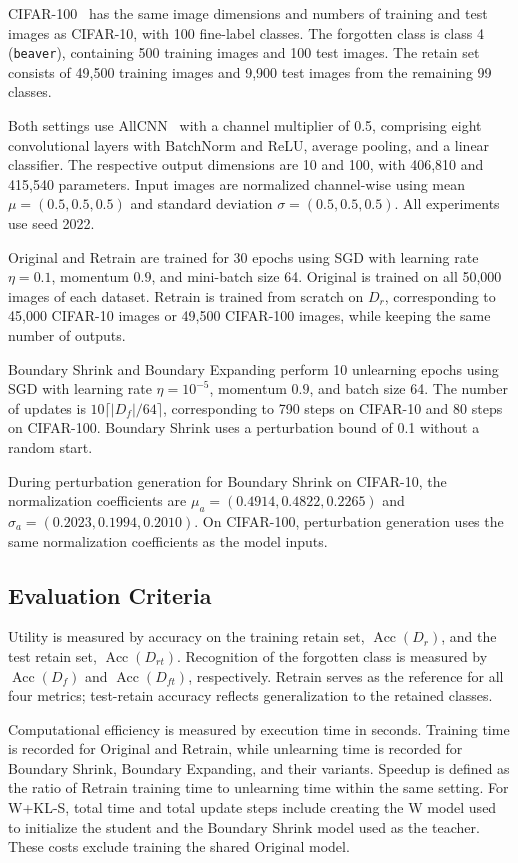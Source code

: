 \documentclass[conference]{IEEEtran}
\begin{document}
CIFAR-100~\cite{krizhevsky2009learning} has the same image dimensions and numbers of training and test images as CIFAR-10, with 100 fine-label classes. The forgotten class is class 4 (\texttt{beaver}), containing 500 training images and 100 test images. The retain set consists of 49,500 training images and 9,900 test images from the remaining 99 classes.

Both settings use AllCNN~\cite{springenberg2015allcnn} with a channel multiplier of 0.5, comprising eight convolutional layers with BatchNorm and ReLU, average pooling, and a linear classifier. The respective output dimensions are 10 and 100, with 406,810 and 415,540 parameters. Input images are normalized channel-wise using mean $\mu=(0.5,0.5,0.5)$ and standard deviation $\sigma=(0.5,0.5,0.5)$. All experiments use seed 2022.

Original and Retrain are trained for 30 epochs using SGD with learning rate $\eta=0.1$, momentum $0.9$, and mini-batch size 64. Original is trained on all 50,000 images of each dataset. Retrain is trained from scratch on $D_r$, corresponding to 45,000 CIFAR-10 images or 49,500 CIFAR-100 images, while keeping the same number of outputs.

Boundary Shrink and Boundary Expanding perform 10 unlearning epochs using SGD with learning rate $\eta=10^{-5}$, momentum $0.9$, and batch size 64. The number of updates is $10\lceil|D_f|/64\rceil$, corresponding to 790 steps on CIFAR-10 and 80 steps on CIFAR-100. Boundary Shrink uses a perturbation bound of 0.1 without a random start.

During perturbation generation for Boundary Shrink on CIFAR-10, the normalization coefficients are $\mu_a=(0.4914,0.4822,0.2265)$ and $\sigma_a=(0.2023,0.1994,0.2010)$. On CIFAR-100, perturbation generation uses the same normalization coefficients as the model inputs.

\subsection{Evaluation Criteria}
Utility is measured by accuracy on the training retain set, $\operatorname{Acc}(D_r)$, and the test retain set, $\operatorname{Acc}(D_{rt})$. Recognition of the forgotten class is measured by $\operatorname{Acc}(D_f)$ and $\operatorname{Acc}(D_{ft})$, respectively. Retrain serves as the reference for all four metrics; test-retain accuracy reflects generalization to the retained classes.

Computational efficiency is measured by execution time in seconds. Training time is recorded for Original and Retrain, while unlearning time is recorded for Boundary Shrink, Boundary Expanding, and their variants. Speedup is defined as the ratio of Retrain training time to unlearning time within the same setting. For W+KL-S, total time and total update steps include creating the W model used to initialize the student and the Boundary Shrink model used as the teacher. These costs exclude training the shared Original model.
\end{document}
